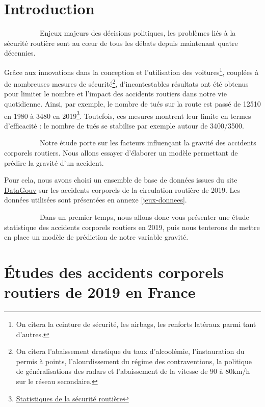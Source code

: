 \documentclass[french,]{tp}
\let\rmarkdownfootnote\footnote%
\def\footnote{\protect\rmarkdownfootnote}
\begin{document}
\newpage

\hypertarget{introduction}{%
\section{Introduction}\label{introduction}}

~~~~~~~~~~Enjeux majeurs des décisions politiques, les problèmes liés à la sécurité routière sont au cœur de tous les débats depuis maintenant quatre décennies.

Grâce aux innovations dans la conception et l'utilisation des voitures\footnote{On citera la ceinture de sécurité, les airbags, les renforts latéraux parmi tant d'autres.}, couplées à de nombreuses mesures de sécurité\footnote{On citera l'abaissement drastique du taux d'alcoolémie, l'instauration du permis à points, l'alourdissement du régime des contraventions, la politique de généralisations des radars et l'abaissement de la vitesse de 90 à 80km/h sur le réseau secondaire.}, d'incontestables résultats ont été obtenus pour limiter le nombre et l'impact des accidents routiers dans notre vie quotidienne. Ainsi, par exemple, le nombre de tués sur la route est passé de 12510 en 1980 à 3480 en 2019\footnote{\href{http://www.securite-routiere.org/Fiches/statistiques/statfr.htm}{Statistiques de la sécurité routière}}. Toutefois, ces mesures montrent leur limite en termes d'efficacité : le nombre de tués se stabilise par exemple autour de 3400/3500.

~~~~~~~~~~Notre étude porte sur les facteurs influençant la gravité des accidents corporels routiers. Nous allons essayer d'élaborer un modèle permettant de prédire la gravité d'un accident.

Pour cela, nous avons choisi un ensemble de base de données issues du site \href{https://www.data.gouv.fr/fr/datasets/bases-de-donnees-annuelles-des-accidents-corporels-de-la-circulation-routiere-annees-de-2005-a-2019/}{DataGouv} sur les accidents corporels de la circulation routière de 2019. Les données utilisées sont présentées en annexe \ref{jeux-donnees}.

~~~~~~~~~~Dans un premier temps, nous allons donc vous présenter une étude statistique des accidents corporels routiers en 2019, puis nous tenterons de mettre en place un modèle de prédiction de notre variable gravité.

\newpage

\hypertarget{uxe9tudes-des-accidents-corporels-routiers-de-2019-en-france}{%
\section{Études des accidents corporels routiers de 2019 en France}\label{uxe9tudes-des-accidents-corporels-routiers-de-2019-en-france}}
\end{document}
